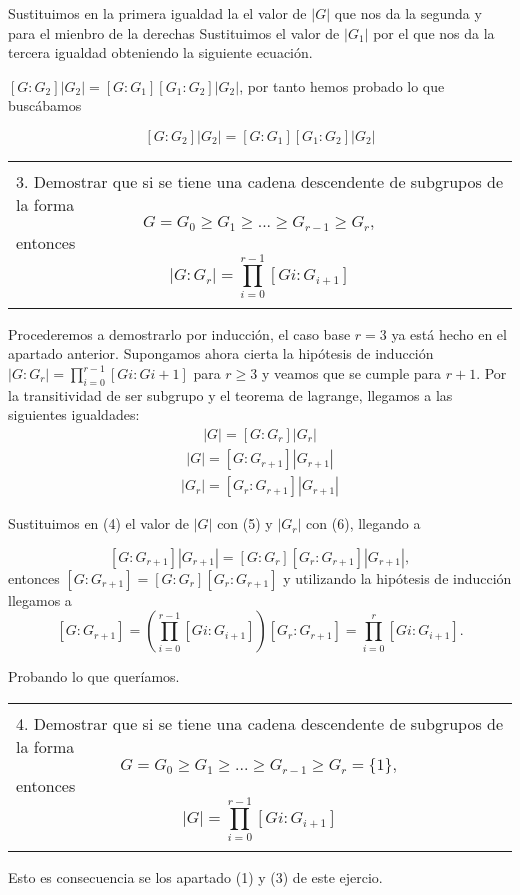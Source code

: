\documentclass[12pt]{article}
\newenvironment{micaja}
{
    \begin{center}
    \begin{tabular}{|p{0.9\textwidth}|}
    \hline\\
    }   
    {   
    \\\\\hline
    \end{tabular} 
    \end{center}
    }
\begin{document}
    Sustituimos en la primera igualdad la el valor de $|G|$ que nos da la segunda y para el mienbro de la derechas Sustituimos
    el valor de $|G_1|$ por el que nos da la tercera igualdad obteniendo la siguiente ecuación. 

    $[G:G_2] |G_2| = [G:G_1] [G_1:G_2] |G_2|$, por tanto hemos probado lo que buscábamos

    $$[G:G_2] |G_2| = [G:G_1] [G_1:G_2] |G_2|$$


    \begin{micaja}
        3. Demostrar que si se tiene una cadena descendente de subgrupos de la forma
        $$G=G_0 \geq G_1 \geq ...   \geq G_{r-1} \geq G_r,$$ 
        entonces 
        $$|G:G_r| = \prod_{i=0}^{r-1}[Gi:G_{i+1}]$$
    \end{micaja}

    Procederemos a demostrarlo por inducción, el caso base $r=3$ ya está hecho en el apartado anterior. 
    Supongamos ahora cierta la hipótesis de inducción $|G:G_r| = \prod_{i=0}^{r-1}[Gi:Gi+1]$ para $r \geq 3$ y veamos que se cumple para 
    $r+1$. 
    Por la transitividad de ser subgrupo y el teorema de lagrange, llegamos a las siguientes igualdades:
    \begin{align}
        |G| = [G:G_r] |G_r|
    \end{align}
    \begin{align}
        |G| = [G:G_{r+1}] |G_{r+1}|
    \end{align}
    \begin{align}
        |G_r| = [G_r:G_{r+1}] |G_{r+1}|
    \end{align}

Sustituimos en (4) el valor de $|G|$ con (5) y $|G_r|$ con (6), llegando a 

$$[G:G_{r+1}] |G_{r+1}|= [G:G_r] [G_r:G_{r+1}] |G_{r+1}|,
$$
entonces 
$[G:G_{r+1}] = [G:G_r] [G_r:G_{r+1}]$ y utilizando la hipótesis de inducción 
llegamos a 
$$[G:G_{r+1}]= (\prod_{i=0}^{r-1}[Gi:G_{i+1}]) [G_r:G_{r+1}] = \prod_{i=0}^{r}[Gi:G_{i+1}].$$

Probando lo que queríamos. 


\begin{micaja}
    4. Demostrar que si se tiene una cadena descendente de subgrupos de la forma
    $$G=G_0 \geq G_1 \geq ...   \geq G_{r-1} \geq G_r=\{1\},$$ 
    entonces 
    $$|G| = \prod_{i=0}^{r-1}[Gi:G_{i+1}]$$
\end{micaja}

Esto es consecuencia se los apartado (1) y (3) de este ejercio. 
\end{document}
